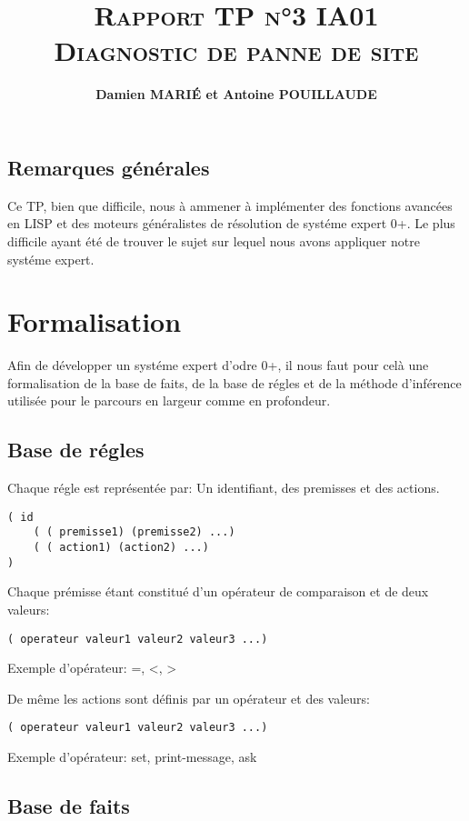 \documentclass[a4paper, 12pt, leqno]{report}
\title{\textsc{\textbf{Rapport TP n°3 IA01 \\ Diagnostic de panne de site}}}
\author{\textbf{Damien MARI\'E et Antoine POUILLAUDE}}
\theoremstyle{plain}
\begin{document}
    \maketitle
    \tableofcontents
\newpage
\section*{Remarques générales}
		Ce TP, bien que difficile, nous à ammener à implémenter des fonctions avancées en LISP et des moteurs généralistes de résolution de systéme expert 0+. Le plus difficile ayant été de trouver le sujet sur lequel nous avons appliquer notre systéme expert.

\chapter{Formalisation}  

Afin de développer un systéme expert d'odre 0+, il nous faut pour celà une formalisation de la base de faits, de la base de régles et de la méthode d'inférence utilisée pour le parcours en largeur comme en profondeur.

 \section{Base de régles}

Chaque régle est représentée par: Un identifiant, des premisses et des actions.

\begin{lstlisting}
( id
	( ( premisse1) (premisse2) ...)
	( ( action1) (action2) ...)
)
\end{lstlisting}

Chaque prémisse étant constitué d'un opérateur de comparaison et de deux valeurs:

\begin{lstlisting}
( operateur valeur1 valeur2 valeur3 ...)
\end{lstlisting}

Exemple d'opérateur: =, <, >

De même les actions sont définis par un opérateur et des valeurs:
\begin{lstlisting}
( operateur valeur1 valeur2 valeur3 ...)
\end{lstlisting}

Exemple d'opérateur: set, print-message, ask

 \section{Base de faits}
\end{document}
